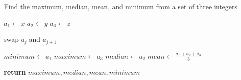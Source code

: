\documentclass[a4paper, 12pt]{article}
\begin{document}
	
	\begin{algorithm}

		\renewcommand{\thealgorithm}{3.1.19}
		
		\caption{Find the maximum, median, mean, and minimum from a set of three integers}
		
		\begin{algorithmic}[1]
			
			
			\State $a_1 \gets x$
			\State $a_2 \gets y$
			\State $a_3 \gets z$
			
						\State swap $a_j$ and $a_{j+1}$
					\EndIf
				\EndFor
			\EndFor
			
			\State $minimum \gets a_1$
			\State $maximum \gets a_3$
			\State $median \gets a_2$
			\State $mean \gets \frac{a_1 + a_2 + a_3}{3}$
			
			\State \textbf{return} $maximum, median, mean, minimum$
			\EndProcedure
			
		\end{algorithmic}

	\end{algorithm}
\end{document}
